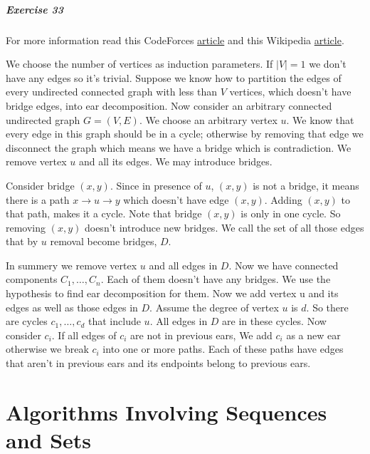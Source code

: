 \documentclass{book}
\begin{document}
	\paragraph{Exercise 33}
	For more information read this CodeForces \href{https://codeforces.com/blog/entry/80932}{article} and this Wikipedia \href{https://en.wikipedia.org/wiki/Ear_decomposition}{article}.
	\par We choose the number of vertices as induction parameters. If $|V| = 1$ we don't have any edges so it's trivial. Suppose we know how to partition the edges of every undirected connected graph with less than $V$ vertices, which doesn't have bridge edges, into ear decomposition. Now consider an arbitrary connected undirected graph $G = (V, E)$. We choose an arbitrary vertex $u$. We know that every edge in this graph should be in a cycle; otherwise by removing that edge we disconnect the graph which means we have a bridge which is contradiction. We remove vertex $u$ and all its edges. We may introduce bridges.
	\par Consider bridge $(x, y)$. Since in presence of $u$, $(x, y)$ is not a bridge, it means there is a path $x \to u \to y$ which doesn't have edge $(x, y)$. Adding $(x, y)$ to that path, makes it a cycle. Note that bridge $(x, y)$ is only in one cycle. So removing $(x, y)$ doesn't introduce new bridges. We call the set of all those edges that by $u$ removal become bridges, $D$.
	\par In summery we remove vertex $u$ and all edges in $D$. Now we have connected components $C_1, \dots, C_n$. Each of them doesn't have any bridges. We use the hypothesis to find ear decomposition for them. Now we add vertex u and its edges as well as those edges in $D$. Assume the degree of vertex $u$ is $d$. So there are cycles $c_1, \dots, c_d$ that include $u$. All edges in $D$ are in these cycles. Now consider $c_i$. If all edges of $c_i$ are not in previous ears, We add $c_i$ as a new ear otherwise we break $c_i$ into one or more paths. Each of these paths have edges that aren't in previous ears and its endpoints belong to previous ears.
	
	\chapter{Algorithms Involving Sequences and Sets}
\end{document}
